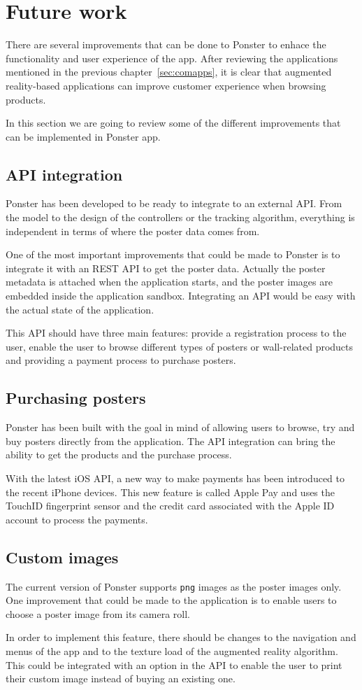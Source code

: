 \section{Future work}
There are several improvements that can be done to Ponster to enhace the
functionality and user experience of the app. After reviewing the applications
mentioned in the previous chapter~\ref{sec:comapps}, it is clear that augmented
reality-based applications can improve customer experience when browsing products. 

In this section we are going to review some of the different improvements that can
be implemented in Ponster app.

\subsection{API integration}
Ponster has been developed to be ready to integrate to an external API. From the
model to the design of the controllers or the tracking algorithm, everything is
independent in terms of where the poster data comes from. 

One of the most important improvements that could be made to Ponster is to integrate
it with an REST API to get the poster data. Actually the poster metadata is attached
when the application starts, and the poster images are embedded inside the
application sandbox. Integrating an API would be easy with the actual state of the
application. 

This API should have three main features: provide a registration process to the
user, enable the user to browse different types of posters or wall-related products
and providing a payment process to purchase posters.

\subsection{Purchasing posters}
Ponster has been built with the goal in mind of allowing users to browse, try and
buy posters directly from the application. The API integration can bring the ability
to get the products and the purchase process.

With the latest iOS API, a new way to make payments has been introduced to the
recent iPhone devices. This new feature is called Apple Pay\cite{applepay} and uses the TouchID
fingerprint sensor and the credit card associated with the Apple ID account to
process the payments.

\subsection{Custom images}
The current version of Ponster supports \texttt{png} images as the poster images
only. One improvement that could be made to the application is to enable users to
choose a poster image from its camera roll.

In order to implement this feature, there should be changes to the navigation and
menus of the app and to the texture load of the augmented reality algorithm. This
could be integrated with an option in the API to enable the user to print their
custom image instead of buying an existing one.
